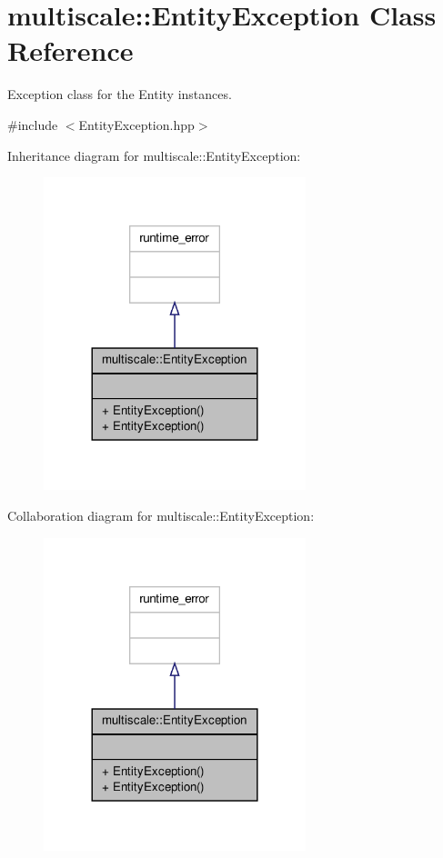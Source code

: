 \hypertarget{classmultiscale_1_1EntityException}{\section{multiscale\-:\-:Entity\-Exception Class Reference}
\label{classmultiscale_1_1EntityException}
}


Exception class for the Entity instances.  




{\ttfamily \#include $<$Entity\-Exception.\-hpp$>$}



Inheritance diagram for multiscale\-:\-:Entity\-Exception\-:\nopagebreak
\begin{figure}[H]
\begin{center}
\leavevmode
\includegraphics[width=216pt]{classmultiscale_1_1EntityException__inherit__graph}
\end{center}
\end{figure}


Collaboration diagram for multiscale\-:\-:Entity\-Exception\-:\nopagebreak
\begin{figure}[H]
\begin{center}
\leavevmode
\includegraphics[width=216pt]{classmultiscale_1_1EntityException__coll__graph}
\end{center}
\end{figure}
